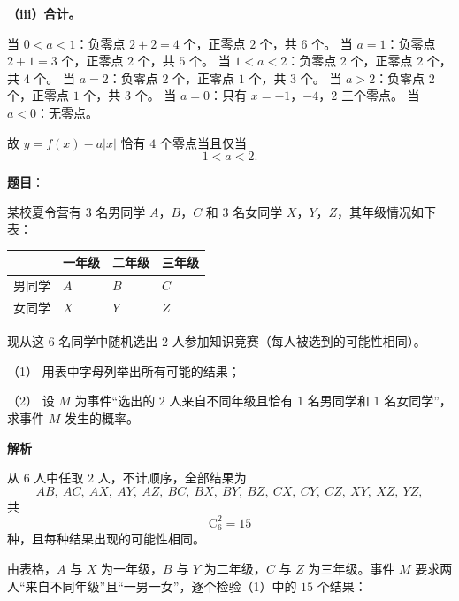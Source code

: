 \begin{answer}
\textbf{（iii）合计。}

当 $0<a<1$：负零点 $2+2=4$ 个，正零点 $2$ 个，共 $6$ 个。
当 $a=1$：负零点 $2+1=3$ 个，正零点 $2$ 个，共 $5$ 个。
当 $1<a<2$：负零点 $2$ 个，正零点 $2$ 个，共 $4$ 个。
当 $a=2$：负零点 $2$ 个，正零点 $1$ 个，共 $3$ 个。
当 $a>2$：负零点 $2$ 个，正零点 $1$ 个，共 $3$ 个。
当 $a=0$：只有 $x=-1$，$-4$，$2$ 三个零点。
当 $a<0$：无零点。

故 $y=f(x)-a|x|$ 恰有 $4$ 个零点当且仅当
\nopagebreak[4]
\[1<a<2.\]


\end{answer}
\begin{answer}

\textbf{题目}：

某校夏令营有 $3$ 名男同学 $A$，$B$，$C$ 和 $3$ 名女同学 $X$，$Y$，$Z$，其年级情况如下表：

\begin{center}
\begin{tabular}{llll}
\toprule
 & 一年级 & 二年级 & 三年级 \\
\midrule
男同学 & $A$ & $B$ & $C$ \\
女同学 & $X$ & $Y$ & $Z$ \\
\bottomrule
\end{tabular}
\end{center}

现从这 $6$ 名同学中随机选出 $2$ 人参加知识竞赛（每人被选到的可能性相同）。

（1） 用表中字母列举出所有可能的结果；

（2） 设 $M$ 为事件“选出的 $2$ 人来自不同年级且恰有 $1$ 名男同学和 $1$ 名女同学”，求事件 $M$ 发生的概率。

\textbf{解析}


从 $6$ 人中任取 $2$ 人，不计顺序，全部结果为
\nopagebreak[4]
\[AB,\ AC,\ AX,\ AY,\ AZ,\ BC,\ BX,\ BY,\ BZ,\ CX,\ CY,\ CZ,\ XY,\ XZ,\ YZ,\]
共
\nopagebreak[4]
\[\mathrm C_6^2=15\]
种，且每种结果出现的可能性相同。


由表格，$A$ 与 $X$ 为一年级，$B$ 与 $Y$ 为二年级，$C$ 与 $Z$ 为三年级。事件 $M$ 要求两人“来自不同年级”且“一男一女”，逐个检验（1）中的 $15$ 个结果：


\end{answer}
